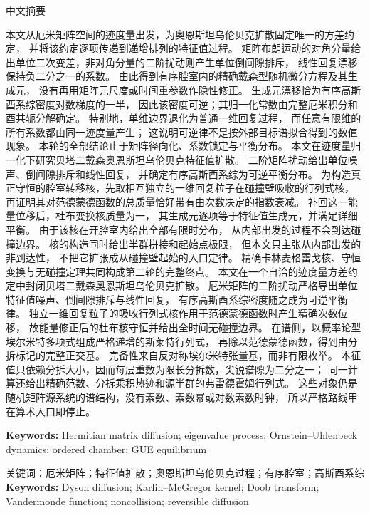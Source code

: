\documentclass[10pt]{article}
\begin{document}
\begin{center}{\cjkfont 中文摘要}\end{center}
{\cjkfont\small\raggedright
\ifcase\CRevisionRound
本文从厄米矩阵空间的迹度量出发，为奥恩斯坦乌伦贝克扩散固定唯一的方差约定，
并将该约定逐项传递到递增排列的特征值过程。
矩阵布朗运动的对角分量给出单位二次变差，非对角分量的二阶扰动则产生单位倒间隙排斥，
线性回复漂移保持负二分之一的系数。
由此得到有序腔室内的精确戴森型随机微分方程及其生成元，
没有再用矩阵元尺度或时间重参数作隐性修正。
生成元漂移恰为有序高斯酉系综密度对数梯度的一半，
因此该密度可逆；其归一化常数由完整厄米积分和酉共轭分解确定。
特别地，单维边界退化为普通一维回复过程，
而任意有限维的所有系数都由同一迹度量产生；
这说明可逆律不是按外部目标谱拟合得到的数值现象。
本轮的全部结论止于矩阵径向化、系数锁定与平衡分布。
\or
本文在迹度量归一化下研究贝塔二戴森奥恩斯坦乌伦贝克特征值扩散。
二阶矩阵扰动给出单位噪声、倒间隙排斥和线性回复，
并确定有序高斯酉系综为可逆平衡分布。
为构造真正守恒的腔室转移核，先取相互独立的一维回复粒子在碰撞壁吸收的行列式核，
再证明其对范德蒙德函数的总质量恰好带有由次数决定的指数衰减。
补回这一能量位移后，杜布变换核质量为一，
其生成元逐项等于特征值生成元，并满足详细平衡。
由于该核在开腔室内给出全部有限时分布，
从内部出发的过程不会到达碰撞边界。
核的构造同时给出半群拼接和起始点极限，
但本文只主张从内部出发的非到达性，
不把它扩张成从碰撞壁起始的入口定律。
精确卡林麦格雷戈核、守恒变换与无碰撞定理共同构成第二轮的完整终点。
\else
本文在一个自洽的迹度量方差约定中封闭贝塔二戴森奥恩斯坦乌伦贝克扩散。
厄米矩阵的二阶扰动严格导出单位特征值噪声、倒间隙排斥与线性回复，
有序高斯酉系综密度随之成为可逆平衡律。
独立一维回复粒子的吸收行列式核作用于范德蒙德函数时产生精确次数位移，
故能量修正后的杜布核守恒并给出全时间无碰撞边界。
在谱侧，以概率论型埃尔米特多项式组成严格递增的斯莱特行列式，
再除以范德蒙德函数，得到由分拆标记的完整正交基。
完备性来自反对称埃尔米特张量基，而非有限枚举。
本征值只依赖分拆大小，因而每层重数为限长分拆数，尖锐谱隙为二分之一；
同一计算还给出精确范数、分拆乘积热迹和源半群的弗雷德霍姆行列式。
这些对象仍是随机矩阵源系统的谱结构，没有素数、素数幂或对数素数时钟，
所以严格路线甲在算术入口即停止。
\fi
\par}

\medskip
\ifcase\CRevisionRound
\noindent\textbf{Keywords:} Hermitian matrix diffusion; eigenvalue process; Ornstein--Uhlenbeck dynamics; ordered chamber; GUE equilibrium

{\cjkfont\noindent 关键词：厄米矩阵；特征值扩散；奥恩斯坦乌伦贝克过程；有序腔室；高斯酉系综}
\or
\noindent\textbf{Keywords:} Dyson diffusion; Karlin--McGregor kernel; Doob transform; Vandermonde function; noncollision; reversible diffusion
\end{document}
